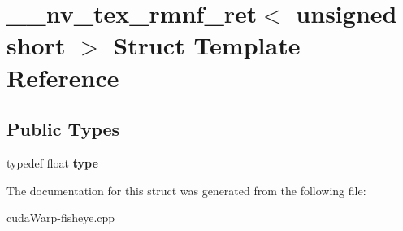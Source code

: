 \hypertarget{struct____nv__tex__rmnf__ret_3_01unsigned_01short_01_4}{}\section{\+\_\+\+\_\+nv\+\_\+tex\+\_\+rmnf\+\_\+ret$<$ unsigned short $>$ Struct Template Reference}
\label{struct____nv__tex__rmnf__ret_3_01unsigned_01short_01_4}
\subsection*{Public Types}
\begin{DoxyCompactItemize}
\item 
typedef float {\bfseries type}\hypertarget{struct____nv__tex__rmnf__ret_3_01unsigned_01short_01_4_a875f3ccf8bde089d554642dbc7ef01dc}{}\label{struct____nv__tex__rmnf__ret_3_01unsigned_01short_01_4_a875f3ccf8bde089d554642dbc7ef01dc}

\end{DoxyCompactItemize}


The documentation for this struct was generated from the following file\+:\begin{DoxyCompactItemize}
\item 
cuda\+Warp-\/fisheye.\+cpp\end{DoxyCompactItemize}
